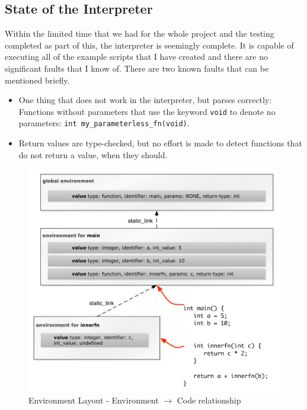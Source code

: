 \subsection{State of the Interpreter}
Within the limited time that we had for the whole project and the testing completed as part of this, the interpreter is seemingly complete. It is capable of executing all of the example scripts that I have created and there are no significant faults that I know of. There are two known faults that can be mentioned briefly.
\begin{itemize}
	\item One thing that does not work in the interpreter, but parses correctly: Functions without parameters that use the keyword \verb!void! to denote no parameters: \verb!int my_parameterless_fn(void)!.
	\item Return values are type-checked, but no effort is made to detect functions that do not return a value, when they should.
\end{itemize}

\begin{figure}[p]
	\includegraphics[scale=0.7]{environments-include.pdf}
	\caption{Environment Layout - Environment $\rightarrow$ Code relationship}
	\label{fig:environment}	
\end{figure}

